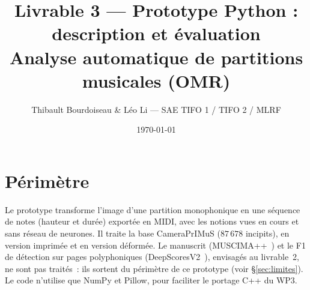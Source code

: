 \documentclass[11pt,a4paper]{article}
\title{\vspace{-1.2cm}\textbf{Livrable 3 --- Prototype Python : description et évaluation\\[2pt]
\large Analyse automatique de partitions musicales (OMR)}}
\author{\normalsize Thibault Bourdoiseau \& Léo Li --- SAE TIFO 1 / TIFO 2 / MLRF}
\date{\vspace{-8pt}\small \today}
\begin{document}
\maketitle
\vspace{-10pt}

\section{Périmètre}
Le prototype transforme l'image d'une partition monophonique en une séquence de notes (hauteur et durée)
exportée en MIDI, avec les notions vues en cours et sans réseau de neurones. Il traite la base CameraPrIMuS
($87\,678$ incipits), en version imprimée et en version déformée. Le manuscrit (MUSCIMA++~\cite{hajic2017}) et
le F1 de détection sur pages polyphoniques (DeepScoresV2~\cite{tuggener2020}), envisagés au livrable~2, ne sont
pas traités~: ils sortent du périmètre de ce prototype (voir §\ref{sec:limites}). Le code n'utilise que NumPy et
Pillow, pour faciliter le portage C++ du WP3.
\end{document}
